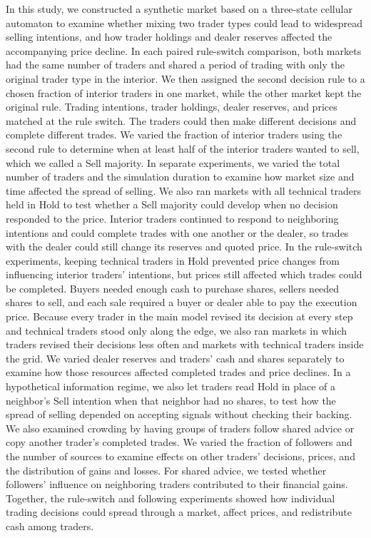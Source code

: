 In this study, we constructed a synthetic market based on a three-state
cellular automaton to examine whether mixing two trader types could lead
to widespread selling intentions, and how trader holdings and dealer
reserves affected the accompanying price decline. In each paired
rule-switch comparison, both markets had the same number of traders and
shared a period of trading with only the original trader type in the
interior. We then assigned the second decision rule to a chosen fraction
of interior traders in one market, while the other market kept the
original rule. Trading intentions, trader holdings, dealer reserves,
and prices matched at the rule switch. The traders could then make
different decisions and complete different trades. We varied the
fraction of interior traders using the second rule to determine when at
least half of the interior traders wanted to sell, which we called a
Sell majority. In separate experiments, we varied the total number of
traders and the simulation duration to examine how market size and time
affected the spread of selling. We also ran markets with all technical
traders held in Hold to test whether a Sell majority could develop when
no decision responded to the price. Interior traders continued to
respond to neighboring intentions and could complete trades with one
another or the dealer, so trades with the dealer could still change its
reserves and quoted price. In the rule-switch experiments, keeping
technical traders in Hold prevented price changes from influencing
interior traders' intentions, but prices still affected which trades
could be completed. Buyers needed enough cash to purchase shares,
sellers needed shares to sell, and each sale required a buyer or dealer
able to pay the execution price. Because every trader in the main model
revised its decision at every step and technical traders stood only
along the edge, we also ran markets in which traders revised their
decisions less often and markets with technical traders inside the grid.
We varied dealer reserves and traders'
cash and shares separately to examine how those resources affected
completed trades and price declines. In a hypothetical information
regime, we also let traders read Hold in place of a neighbor's Sell
intention when that neighbor had no shares, to test how the spread of
selling depended on accepting signals without checking their backing.
We also examined crowding by having
groups of traders follow shared advice or copy another trader's
completed trades. We varied the fraction of followers and the number of
sources to examine effects on other traders' decisions, prices, and the
distribution of gains and losses. For shared advice, we tested whether
followers' influence on neighboring traders contributed to their
financial gains. Together, the rule-switch and following experiments
showed how individual trading decisions could spread through a market,
affect prices, and redistribute cash among traders.

